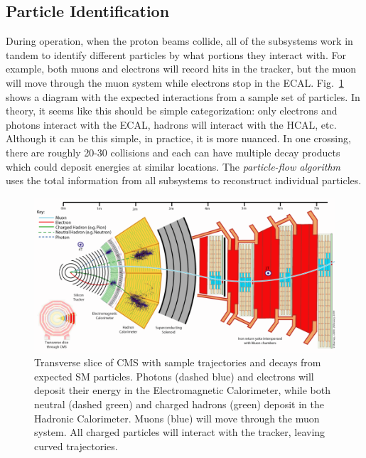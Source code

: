 \subsection{Particle Identification}
\label{sec:ParticleID}

During operation, when the proton beams collide, all of the subsystems work in tandem to identify different particles by what portions they interact with. For example, both muons and electrons will record hits in the tracker, but the muon will move through the muon system while electrons stop in the ECAL. Fig.~\ref{fig:CMSSliceWithTracks} shows a diagram with the expected interactions from a sample set of particles. In theory, it seems like this should be simple categorization: only electrons and photons interact with the ECAL, hadrons will interact with the HCAL, etc. Although it can be this simple, in practice, it is more nuanced. In one crossing, there are roughly 20-30 collisions and each can have multiple decay products which could deposit energies at similar locations. The \textit{particle-flow algorithm}~\cite{ParticleFlowAlgo} uses the total information from all subsystems to reconstruct individual particles.

\begin{figure}[htbp]
\begin{center}
\includegraphics[width=.9\linewidth]{Experiment/figures/CMSSliceWithTracks.png}
\caption[Trajectories and Decays for Particle Identification in CMS]{Transverse slice of CMS with sample trajectories and decays from expected SM particles. Photons (dashed blue) and electrons will deposit their energy in the Electromagnetic Calorimeter, while both neutral (dashed green) and charged hadrons (green) deposit in the Hadronic Calorimeter. Muons (blue) will move through the muon system. All charged particles will interact with the tracker, leaving curved trajectories.}
\label{fig:CMSSliceWithTracks}
\end{center}
\end{figure}

